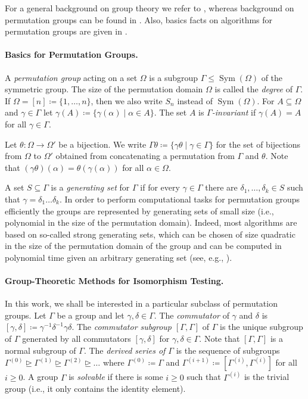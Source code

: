 \PassOptionsToPackage{dvipsnames,svgnames}{xcolor}\documentclass[10pt,a4paper]{article}
\DeclareMathOperator{\Sym}{Sym}
\begin{document}
For a general background on group theory we refer to \cite{Rotman99}, whereas background on permutation groups can be found in \cite{DixonM96}.
Also, basics facts on algorithms for permutation groups are given in \cite{Seress03}.

\paragraph{Basics for Permutation Groups.}

A \emph{permutation group} acting on a set $\Omega$ is a subgroup $\Gamma \leq \Sym(\Omega)$ of the symmetric group.
The size of the permutation domain $\Omega$ is called the \emph{degree} of $\Gamma$.
If $\Omega = [n] \coloneqq \{1,\dots,n\}$, then we also write $S_n$ instead of $\Sym(\Omega)$.
For $A \subseteq \Omega$ and $\gamma \in \Gamma$ let $\gamma(A) \coloneqq \{\gamma(\alpha) \mid \alpha \in A\}$.
The set $A$ is \emph{$\Gamma$-invariant} if $\gamma(A) = A$ for all $\gamma \in \Gamma$.

Let $\theta\colon \Omega \rightarrow \Omega'$ be a bijection.
We write $\Gamma\theta \coloneqq \{\gamma\theta \mid \gamma \in \Gamma\}$ for the set of bijections from $\Omega$ to $\Omega'$ obtained from concatenating a permutation from $\Gamma$ and $\theta$.
Note that $(\gamma\theta)(\alpha) = \theta(\gamma(\alpha))$ for all $\alpha \in \Omega$.

A set $S \subseteq \Gamma$ is a \emph{generating set} for $\Gamma$ if for every $\gamma \in \Gamma$ there are $\delta_1,\dots,\delta_k \in S$ such that $\gamma = \delta_1 \dots \delta_k$.
In order to perform computational tasks for permutation groups efficiently the groups are represented by generating sets of small size (i.e., polynomial in the size of the permutation domain).
Indeed, most algorithms are based on so-called strong generating sets,
which can be chosen of size quadratic in the size of the permutation domain of the group and can be computed in polynomial time given an arbitrary generating set (see, e.g., \cite{Seress03}).

\paragraph{Group-Theoretic Methods for Isomorphism Testing.}

In this work, we shall be interested in a particular subclass of permutation groups.
Let $\Gamma$ be a group and let $\gamma,\delta \in \Gamma$.
The \emph{commutator} of $\gamma$ and $\delta$ is $[\gamma,\delta] \coloneqq \gamma^{-1}\delta^{-1}\gamma\delta$.
The \emph{commutator subgroup $[\Gamma,\Gamma]$} of $\Gamma$ is the unique subgroup of $\Gamma$ generated by all commutators $[\gamma,\delta]$ for $\gamma,\delta \in \Gamma$.
Note that $[\Gamma,\Gamma]$ is a normal subgroup of $\Gamma$.
The \emph{derived series of $\Gamma$} is the sequence of subgroups $\Gamma^{(0)} \trianglerighteq \Gamma^{(1)} \trianglerighteq \Gamma^{(2)} \trianglerighteq \dots$ where $\Gamma^{(0)} \coloneqq \Gamma$ and $\Gamma^{(i+1)} \coloneqq [\Gamma^{(i)},\Gamma^{(i)}]$ for all $i \geq 0$.
A group $\Gamma$ is \emph{solvable} if there is some $i \geq 0$ such that $\Gamma^{(i)}$ is the trivial group (i.e., it only contains the identity element).
\end{document}
